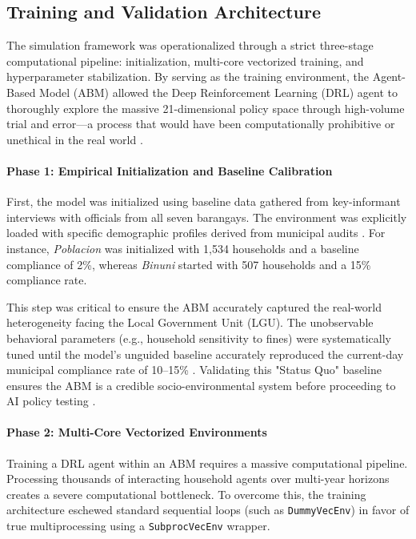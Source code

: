 \subsection{Training and Validation Architecture}

The simulation framework was operationalized through a strict three-stage computational pipeline: initialization, multi-core vectorized training, and hyperparameter stabilization. By serving as the training environment, the Agent-Based Model (ABM) allowed the Deep Reinforcement Learning (DRL) agent to thoroughly explore the massive 21-dimensional policy space through high-volume trial and error—a process that would have been computationally prohibitive or unethical in the real world \citep{TianReview2024}.

\paragraph{Phase 1: Empirical Initialization and Baseline Calibration}
First, the model was initialized using baseline data gathered from key-informant interviews with officials from all seven barangays. The environment was explicitly loaded with specific demographic profiles derived from municipal audits \citep{Yazawa2025}. For instance, \textit{Poblacion} was initialized with 1,534 households and a baseline compliance of 2\%, whereas \textit{Binuni} started with 507 households and a 15\% compliance rate. 

This step was critical to ensure the ABM accurately captured the real-world heterogeneity facing the Local Government Unit (LGU). The unobservable behavioral parameters (e.g., household sensitivity to fines) were systematically tuned until the model's unguided baseline accurately reproduced the current-day municipal compliance rate of 10–15\% \citep{Jimenez2025}. Validating this "Status Quo" baseline ensures the ABM is a credible socio-environmental system before proceeding to AI policy testing \citep{Ma2023}.

\paragraph{Phase 2: Multi-Core Vectorized Environments}
Training a DRL agent within an ABM requires a massive computational pipeline. Processing thousands of interacting household agents over multi-year horizons creates a severe computational bottleneck. To overcome this, the training architecture eschewed standard sequential loops (such as \texttt{DummyVecEnv}) in favor of true multiprocessing using a \texttt{SubprocVecEnv} wrapper.

